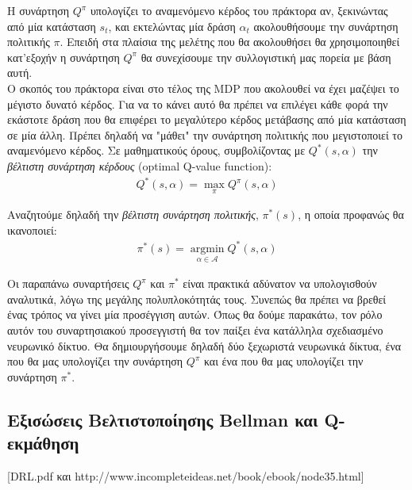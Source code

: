 \documentclass[11pt]{article} %
\numberwithin{equation}{subsection}
\begin{document}
Η συνάρτηση $Q^\pi$ υπολογίζει το αναμενόμενο κέρδος του πράκτορα αν, ξεκινώντας από μία κατάσταση $s_t$, και εκτελώντας μία δράση $\alpha_t$ ακολουθήσουμε την συνάρτηση πολιτικής $\mathcal{\pi}$. Επειδή στα πλαίσια της μελέτης που θα ακολουθήσει θα χρησιμοποιηθεί κατ'εξοχήν η συνάρτηση $Q^\pi$ θα συνεχίσουμε την συλλογιστική μας πορεία με βάση αυτή.\\

Ο σκοπός του πράκτορα είναι στο τέλος της MDP που ακολουθεί να έχει μαζέψει το μέγιστο δυνατό κέρδος. Για να το κάνει αυτό θα πρέπει να επιλέγει κάθε φορά την εκάστοτε δράση που θα επιφέρει το μεγαλύτερο κέρδος μετάβασης από μία κατάσταση σε μία άλλη. Πρέπει δηλαδή να "μάθει" την συνάρτηση πολιτικής που μεγιστοποιεί το αναμενόμενο κέρδος. Σε μαθηματικούς όρους, συμβολίζοντας με $Q^*(s,\alpha)$ την \textit{βέλτιστη συνάρτηση κέρδους} (optimal Q-value function):
\begin{align*}
Q^*(s,\alpha) = \max_{\mathcal{\pi}} Q^\pi(s,\alpha)
\end{align*}

Αναζητούμε δηλαδή την \textit{βέλτιστη συνάρτηση πολιτικής}, $\pi ^* (s)$, η οποία προφανώς θα ικανοποιεί:
\begin{align*}
\pi^* (s) = \operatorname*{argmin}_{\alpha \in \mathcal{A}} Q^* (s,\alpha)
\end{align*}

Οι παραπάνω συναρτήσεις $Q^\pi$ και $\pi^*$ είναι πρακτικά αδύνατον να υπολογισθούν αναλυτικά, λόγω της μεγάλης πολυπλοκότητάς τους. Συνεπώς θα πρέπει να βρεθεί ένας τρόπος να γίνει μία προσέγγιση αυτών. Όπως θα δούμε παρακάτω, τον ρόλο αυτόν του συναρτησιακού προσεγγιστή θα τον παίξει ένα κατάλληλα σχεδιασμένο νευρωνικό δίκτυο. Θα δημιουργήσουμε δηλαδή δύο ξεχωριστά νευρωνικά δίκτυα, ένα που θα μας υπολογίζει την συνάρτηση $Q^\pi$ και ένα που θα μας υπολογίζει την συνάρτηση $\pi^*$.\\

\subsection{Εξισώσεις Βελτιστοποίησης Bellman και Q-εκμάθηση}
[DRL.pdf και http://www.incompleteideas.net/book/ebook/node35.html]
\end{document}
